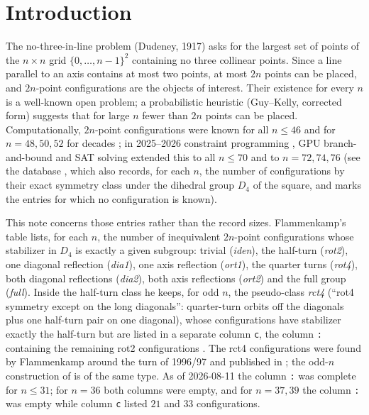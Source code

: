 \documentclass[11pt]{article}
\theoremstyle{remark}
\newcommand{\Dfour}{D_4}
\begin{document}
\section{Introduction}
The no-three-in-line problem (Dudeney, 1917) asks for the largest set of points of the $n\times n$ grid $\{0,\dots,n-1\}^2$
containing no three collinear points.  Since a line parallel to an axis contains at most two points, at most $2n$ points can be
placed, and $2n$-point configurations are the objects of interest.  Their existence for every $n$ is a well-known open problem;
a probabilistic heuristic (Guy--Kelly, corrected form) suggests that for large $n$ fewer than $2n$ points can be placed.
Computationally, $2n$-point configurations were known for all $n\le 46$ and for $n=48,50,52$ for decades
\cite{Flammenkamp92,Flammenkamp98}; in 2025--2026 constraint programming \cite{Prellberg26}, GPU branch-and-bound
\cite{Riley} and SAT solving extended this to all $n\le 70$ and to $n=72,74,76$ (see the database \cite{FlammenkampDB},
which also records, for each $n$, the number of configurations by their exact symmetry class under the dihedral group
$\Dfour$ of the square, and marks the entries for which no configuration is known).

This note concerns those entries rather than the record sizes.  Flammenkamp's table lists, for each $n$, the number of
inequivalent $2n$-point configurations whose stabilizer in $\Dfour$ is exactly a given subgroup: trivial (\emph{iden}), the
half-turn (\emph{rot2}), one diagonal reflection (\emph{dia1}), one axis reflection (\emph{ort1}), the quarter turns
(\emph{rot4}), both diagonal reflections (\emph{dia2}), both axis reflections (\emph{ort2}) and the full group (\emph{full}).
Inside the half-turn class he keeps, for odd $n$, the pseudo-class \emph{rct4} (``rot4 symmetry except on the long
diagonals'': quarter-turn orbits off the diagonals plus one half-turn pair on one diagonal), whose configurations have
stabilizer exactly the half-turn but are listed in a separate column \texttt{c}, the column \texttt{:} containing the
remaining rot2 configurations \cite{FlammenkampDB}.  The rct4 configurations were found by Flammenkamp around the turn of
1996/97 and published in \cite{Flammenkamp98}; the odd-$n$ construction of \cite{Prellberg26} is of the same type.  As of
2026-08-11 the column \texttt{:} was complete for $n\le31$; for $n=36$ both columns were empty, and for $n=37,39$ the column
\texttt{:} was empty while column \texttt{c} listed $21$ and $33$ configurations.
\end{document}
